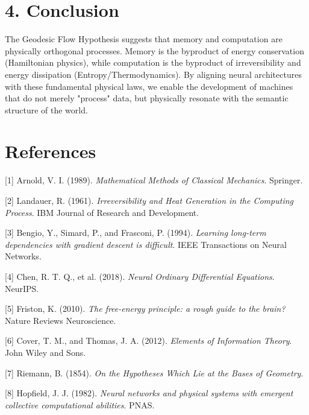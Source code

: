 \documentclass[12pt]{article}
\begin{document}
\section{4. Conclusion}

The Geodesic Flow Hypothesis suggests that memory and computation are physically orthogonal processes. Memory is the byproduct of energy conservation (Hamiltonian physics), while computation is the byproduct of irreversibility and energy dissipation (Entropy/Thermodynamics). By aligning neural architectures with these fundamental physical laws, we enable the development of machines that do not merely "process" data, but physically resonate with the semantic structure of the world.

\section*{References}

[1] Arnold, V. I. (1989). \textit{Mathematical Methods of Classical Mechanics}. Springer.

[2] Landauer, R. (1961). \textit{Irreversibility and Heat Generation in the Computing Process}. IBM Journal of Research and Development.

[3] Bengio, Y., Simard, P., and Frasconi, P. (1994). \textit{Learning long-term dependencies with gradient descent is difficult}. IEEE Transactions on Neural Networks.

[4] Chen, R. T. Q., et al. (2018). \textit{Neural Ordinary Differential Equations}. NeurIPS.

[5] Friston, K. (2010). \textit{The free-energy principle: a rough guide to the brain?} Nature Reviews Neuroscience.

[6] Cover, T. M., and Thomas, J. A. (2012). \textit{Elements of Information Theory}. John Wiley and Sons.

[7] Riemann, B. (1854). \textit{On the Hypotheses Which Lie at the Bases of Geometry}.

[8] Hopfield, J. J. (1982). \textit{Neural networks and physical systems with emergent collective computational abilities}. PNAS.
\end{document}
